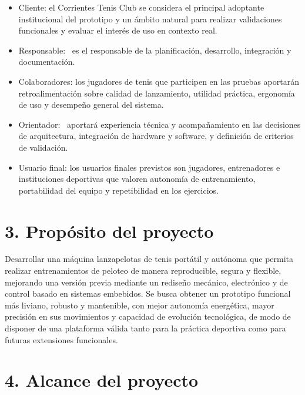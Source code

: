 ﻿\documentclass[
11pt, %
]{charter}
\begin{document}
\begin{itemize}
	\item Cliente: el Corrientes Tenis Club se considera el principal adoptante institucional del prototipo y un ámbito natural para realizar validaciones funcionales y evaluar el interés de uso en contexto real.
	\item Responsable: \authorname\ es el responsable de la planificación, desarrollo, integración y documentación.
	\item Colaboradores: los jugadores de tenis que participen en las pruebas aportarán retroalimentación sobre calidad de lanzamiento, utilidad práctica, ergonomía de uso y desempeño general del sistema.
	\item Orientador: \supname\ aportará experiencia técnica y acompañamiento en las decisiones de arquitectura, integración de hardware y software, y definición de criterios de validación.
	\item Usuario final: los usuarios finales previstos son jugadores, entrenadores e instituciones deportivas que valoren autonomía de entrenamiento, portabilidad del equipo y repetibilidad en los ejercicios.
\end{itemize}

\newpage
\section{3. Propósito del proyecto}
\label{sec:proposito}

Desarrollar una máquina lanzapelotas de tenis portátil y autónoma que permita realizar entrenamientos de peloteo de manera reproducible, segura y flexible, mejorando una versión previa mediante un rediseño mecánico, electrónico y de control basado en sistemas embebidos. Se busca obtener un prototipo funcional más liviano, robusto y mantenible, con mejor autonomía energética, mayor precisión en sus movimientos y capacidad de evolución tecnológica, de modo de disponer de una plataforma válida tanto para la práctica deportiva como para futuras extensiones funcionales.


\section{4. Alcance del proyecto}
\label{sec:alcance}
\end{document}
